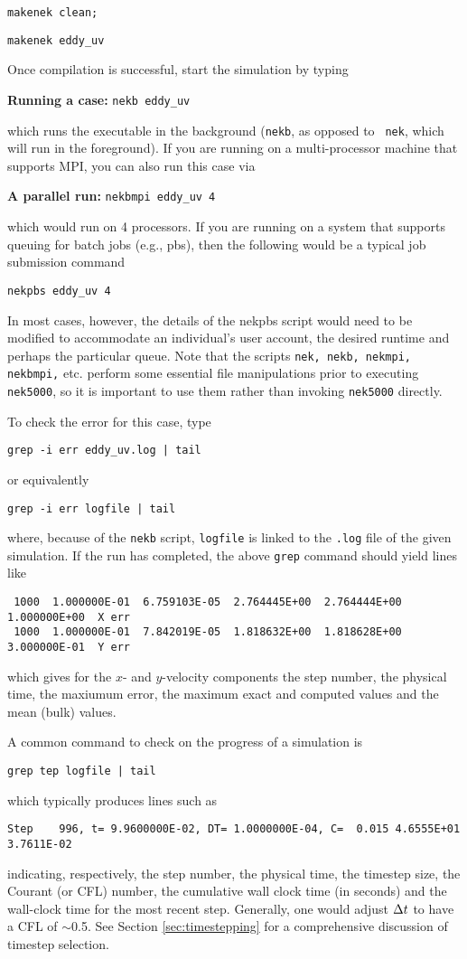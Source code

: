 {\tt makenek clean;}  

{\tt makenek eddy\_uv} 

\noindent
Once compilation is successful, start the simulation by typing
 

{\bf Running a case:}
{\tt nekb eddy\_uv } 

which runs the executable in the background ({\tt nekb}, as opposed to {\tt
nek}, which will run in the foreground).  
If you are running on a multi-processor machine that supports MPI, you
can also run this case via

{\bf A parallel run:}
{\tt nekbmpi eddy\_uv 4}

\noindent
which would run on 4 processors.    If you are running on a system
that supports queuing for batch jobs (e.g., pbs), then the following
would be a typical job submission command

{\tt nekpbs eddy\_uv 4}

In most cases, however, the details of the nekpbs script would need
to be modified to accommodate an individual's user account, the 
desired runtime and perhaps the particular queue.   Note that the
scripts {\tt nek, nekb, nekmpi, nekbmpi,} etc. perform some essential
file manipulations prior to executing {\tt nek5000}, so it is important
to use them rather than invoking {\tt nek5000} directly.


To check the error for this case, type
\begin{verbatim}
grep -i err eddy_uv.log | tail
\end{verbatim}
or equivalently
\begin{verbatim}
grep -i err logfile | tail
\end{verbatim}
where, because of the {\tt nekb} script, {\tt logfile} is 
linked to the {\tt .log} file of the given simulation. 
If the run has completed, the above {\tt grep} command should yield lines like
\scriptsize
\begin{verbatim}
 1000  1.000000E-01  6.759103E-05  2.764445E+00  2.764444E+00  1.000000E+00  X err
 1000  1.000000E-01  7.842019E-05  1.818632E+00  1.818628E+00  3.000000E-01  Y err
\end{verbatim}
\normalsize
which gives for the $x$- and $y$-velocity components the 
step number, the physical time, the maxiumum error, the maximum exact
and computed values and the mean (bulk) values.

A common command to check on the progress of a simulation is
\begin{verbatim}
grep tep logfile | tail
\end{verbatim}
which typically produces lines such as
\scriptsize
\begin{verbatim}
Step    996, t= 9.9600000E-02, DT= 1.0000000E-04, C=  0.015 4.6555E+01 3.7611E-02
\end{verbatim}
\normalsize
indicating, respectively, the step number, the physical time, the
timestep size, the Courant (or CFL) number, the cumulative wall clock time (in seconds)
and the wall-clock time for the most recent step.   Generally, one would 
adjust $\Delta t$ to have a CFL of $\sim$0.5.  See Section \ref{sec:timestepping} for
a comprehensive discussion of timestep selection.

